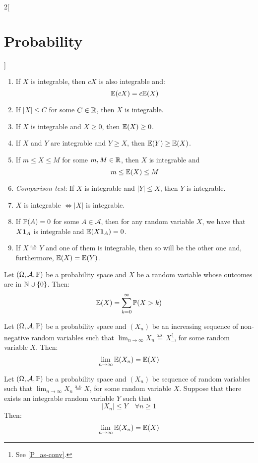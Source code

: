 \documentclass[../../../main.tex]{subfiles}
\begin{document}
\begin{multicols}{2}[\section{Probability}]
\begin{proposition}
\begin{enumerate}
      \item If $X$ is integrable, then $cX$ is also integrable and: $$\mathbb{E}(cX)=c\mathbb{E}(X)$$
      \item If $|X|\leq C$ for some $C\in \mathbb{R}$, then $X$ is integrable.
      \item If $X$ is integrable and $X\geq 0$, then $\mathbb{E}(X)\geq 0$.
      \item If $X$ and $Y$ are integrable and $Y\geq X$, then $\mathbb{E}(Y)\geq \mathbb{E}(X)$.
      \item If $m\leq X\leq M$ for some $m, M\in\mathbb{R}$, then $X$ is integrable and $$m\leq \mathbb{E}(X)\leq M$$
      \item \emph{Comparison test}: If $X$ is integrable and $|Y|\leq X$, then $Y$ is integrable.
      \item $X$ is integrable $\iff |X|$ is integrable.
      \item If $\mathbb{P}(A)=0$ for some $A\in\mathcal{A}$, then for any random variable $X$, we have that $X\boldsymbol{\mathrm{1}}_A$ is integrable and $\mathbb{E}(X\boldsymbol{\mathrm{1}}_A)=0$.
      \item If $X\overset{\text{a.s.}}{=}Y$ and one of them is integrable, then so will be the other one and, furthermore, $\mathbb{E}(X)=\mathbb{E}(Y)$.
    \end{enumerate}
  \end{proposition}
  \begin{proposition}
    Let $(\Omega,\mathcal{A},\mathbb{P})$ be a probability space and $X$ be a random variable whose outcomes are in $\mathbb{N}\cup\{0\}$. Then: $$\mathbb{E}(X)=\sum_{k=0}^\infty\mathbb{P}(X>k)$$
  \end{proposition}
  \begin{theorem}
    Let $(\Omega,\mathcal{A},\mathbb{P})$ be a probability space and $(X_n)$ be an increasing sequence of non-negative random variables such that $\displaystyle\lim_{n\to\infty}X_n\overset{\text{a.s.}}{=}X$\footnote{See \cref{P_as-conv}.}, for some random variable $X$. Then: $$\lim_{n\to\infty} \mathbb{E}(X_n)=\mathbb{E}(X)$$
  \end{theorem}
  \begin{theorem}
    Let $(\Omega,\mathcal{A},\mathbb{P})$ be a probability space and $(X_n)$ be sequence of random variables such that $\displaystyle\lim_{n\to\infty}X_n\overset{\text{a.s.}}{=}X$, for some random variable $X$. Suppose that there exists an integrable random variable $Y$ such that $$|X_n|\leq Y\quad\forall n\geq 1$$ Then: $$\lim_{n\to\infty} \mathbb{E}(X_n)=\mathbb{E}(X)$$
  \end{theorem}

\end{multicols}
\end{document}
